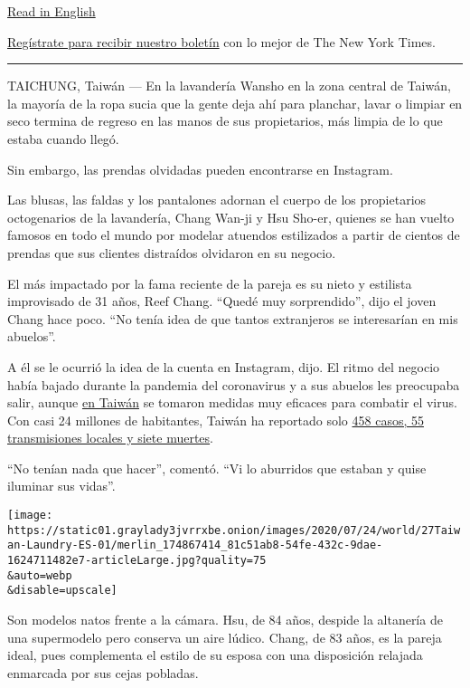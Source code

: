 \href{https://www.nytimes3xbfgragh.onion/2020/07/24/world/asia/taiwan-octogenarian-couple-instagram-laundry.html}{Read
in English}

\href{https://www.nytimes3xbfgragh.onion/newsletters/el-times}{Regístrate
para recibir nuestro boletín} con lo mejor de The New York Times.

\begin{center}\rule{0.5\linewidth}{\linethickness}\end{center}

TAICHUNG, Taiwán --- En la lavandería Wansho en la zona central de
Taiwán, la mayoría de la ropa sucia que la gente deja ahí para planchar,
lavar o limpiar en seco termina de regreso en las manos de sus
propietarios, más limpia de lo que estaba cuando llegó.

Sin embargo, las prendas olvidadas pueden encontrarse en Instagram.

Las blusas, las faldas y los pantalones adornan el cuerpo de los
propietarios octogenarios de la lavandería, Chang Wan-ji y Hsu Sho-er,
quienes se han vuelto famosos en todo el mundo por modelar atuendos
estilizados a partir de cientos de prendas que sus clientes distraídos
olvidaron en su negocio.

El más impactado por la fama reciente de la pareja es su nieto y
estilista improvisado de 31 años, Reef Chang. ``Quedé muy sorprendido'',
dijo el joven Chang hace poco. ``No tenía idea de que tantos extranjeros
se interesarían en mis abuelos''.

A él se le ocurrió la idea de la cuenta en Instagram, dijo. El ritmo del
negocio había bajado durante la pandemia del coronavirus y a sus abuelos
les preocupaba salir, aunque
\href{https://www.nytimes3xbfgragh.onion/interactive/2020/04/09/world/asia/coronavirus-hong-kong-singapore-taiwan.html?searchResultPosition=26}{en
Taiwán} se tomaron medidas muy eficaces para combatir el virus. Con casi
24 millones de habitantes, Taiwán ha reportado solo
\href{https://www.cdc.gov.tw/En}{458 casos, 55 transmisiones locales y
siete muertes}.

``No tenían nada que hacer'', comentó. ``Vi lo aburridos que estaban y
quise iluminar sus vidas''.

\texttt{[image: https://static01.graylady3jvrrxbe.onion/images/2020/07/24/world/27Taiwan-Laundry-ES-01/merlin\_174867414\_81c51ab8-54fe-432c-9dae-1624711482e7-articleLarge.jpg?quality=75\\\&auto=webp\\\&disable=upscale]}

Son modelos natos frente a la cámara. Hsu, de 84 años, despide la
altanería de una supermodelo pero conserva un aire lúdico. Chang, de 83
años, es la pareja ideal, pues complementa el estilo de su esposa con
una disposición relajada enmarcada por sus cejas pobladas.

